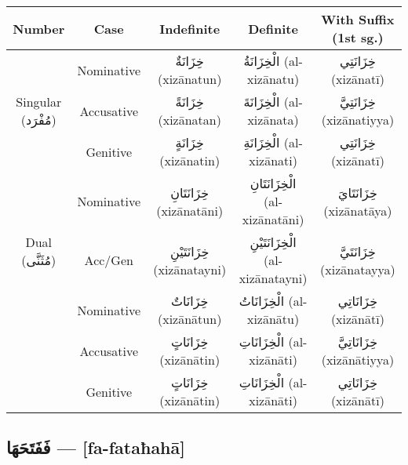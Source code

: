 \documentclass[letterpaper,12pt]{article}
\begin{document}
\begin{tabular}{|c|c|c|c|c|}
\hline
\textbf{Number} & \textbf{Case} & \textbf{Indefinite} & \textbf{Definite} & \textbf{With Suffix (1st sg.)} \\
\hline
\multirow{3}{*}{Singular (\textarabic{مُفْرَد})} 
 & Nominative   & \textarabic{خِزَانَةٌ} (xizānatun) & \textarabic{الْخِزَانَةُ} (al-xizānatu) & \textarabic{خِزَانَتِي} (xizānatī) \\
 & Accusative   & \textarabic{خِزَانَةً} (xizānatan) & \textarabic{الْخِزَانَةَ} (al-xizānata) & \textarabic{خِزَانَتِيَّ} (xizānatiyya) \\
 & Genitive     & \textarabic{خِزَانَةٍ} (xizānatin) & \textarabic{الْخِزَانَةِ} (al-xizānati) & \textarabic{خِزَانَتِي} (xizānatī) \\
\hline
\multirow{3}{*}{Dual (\textarabic{مُثَنَّى})} 
 & Nominative   & \textarabic{خِزَانَتَانِ} (xizānatāni) & \textarabic{الْخِزَانَتَانِ} (al-xizānatāni) & \textarabic{خِزَانَتَايَ} (xizānatāya) \\
 & Acc/Gen      & \textarabic{خِزَانَتَيْنِ} (xizānatayni) & \textarabic{الْخِزَانَتَيْنِ} (al-xizānatayni) & \textarabic{خِزَانَتَيَّ} (xizānatayya) \\
\hline
\multirow{3}{*}{Plural (\textarabic{جَمْع})} 
  & Nominative    & \textarabic{خِزَانَاتٌ} (xizānātun) & \textarabic{الْخِزَانَاتُ} (al-xizānātu) & \textarabic{خِزَانَاتِي} (xizānātī) \\
  & Accusative      & \textarabic{خِزَانَاتٍ} (xizānātin) & \textarabic{الْخِزَانَاتِ} (al-xizānāti) & \textarabic{خِزَانَاتِيَّ} (xizānātiyya) \\
  & Genitive          & \textarabic{خِزَانَاتٍ} (xizānātin) & \textarabic{الْخِزَانَاتِ} (al-xizānāti) & \textarabic{خِزَانَاتِي} (xizānātī) \\
\hline
\end{tabular}

\subsection{\textarabic{فَفَتَحَهَا} — [fa-fataħahā]}
\end{document}
